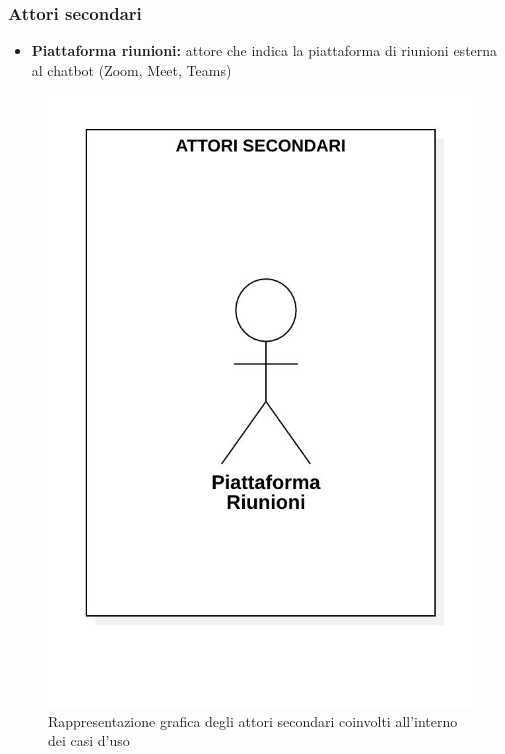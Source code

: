 \subsubsection{Attori secondari}
\begin{itemize}
    \item \textbf{Piattaforma riunioni:} attore che indica la piattaforma di riunioni esterna al chatbot (Zoom, Meet, Teams)
\end{itemize}
\begin{figure}[H]
    \centering
    \includegraphics[scale=0.35]{images/attori_secondari.jpg} 
    \caption{Rappresentazione grafica degli attori secondari coinvolti all'interno dei casi d'uso}
\end{figure}
\newpage